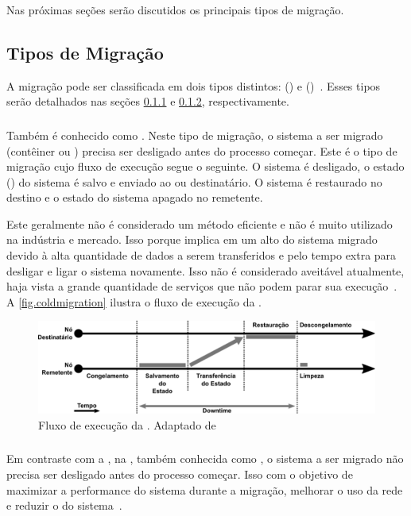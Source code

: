 Nas próximas seções serão discutidos os principais tipos de migração.

\subsection{Tipos de Migração}
A migração pode ser classificada em dois tipos distintos: \coldmigration(\nonlivemigration) e \hotmigration (\livemigration)~\cite{imran2022live}. Esses tipos serão detalhados nas seções \ref{sec.coldmigration} e \ref{sec.hotmigration}, respectivamente.

\subsubsection{\Coldmigration}\label{sec.coldmigration}
Também é conhecido como \nonlivemigration. Neste tipo de migração, o sistema a ser migrado (contêiner ou \vm) precisa ser desligado antes do processo começar. Este é o tipo de migração cujo fluxo de execução segue o seguinte. O sistema é desligado, o estado (\checkpoint) do sistema é salvo e enviado ao \so ou \vm destinatário. O sistema é restaurado no destino e o estado do sistema apagado no remetente.

Este geralmente não é considerado um método eficiente e não é muito utilizado na indústria e mercado. Isso porque implica em um alto \downtime do sistema migrado devido à alta quantidade de dados a serem transferidos e pelo tempo extra para desligar e ligar o sistema novamente. Isso não é considerado aveitável atualmente, haja vista a grande quantidade de serviços que não podem parar sua execução~\cite{singh2022predictive, imran2022live}. A \autoref{fig.coldmigration} ilustra o fluxo de execução da \coldmigration.

\begin{figure}[bt]
    \centering
    \includegraphics[width=0.8\linewidth]{content/images/cold-migration-flow.pdf}
    \caption{Fluxo de execução da \coldmigration. Adaptado de~\cite{migrationimages}}
    \label{fig.coldmigration}
\end{figure}

\subsubsection{\Hotmigration}\label{sec.hotmigration}
Em contraste com a \coldmigration, na \hotmigration, também conhecida como \livemigration, o sistema a ser migrado não precisa ser desligado antes do processo começar. Isso com o objetivo de maximizar a performance do sistema durante a migração, melhorar o uso da rede e reduzir o \downtime do sistema~\cite{imran2022live}.

